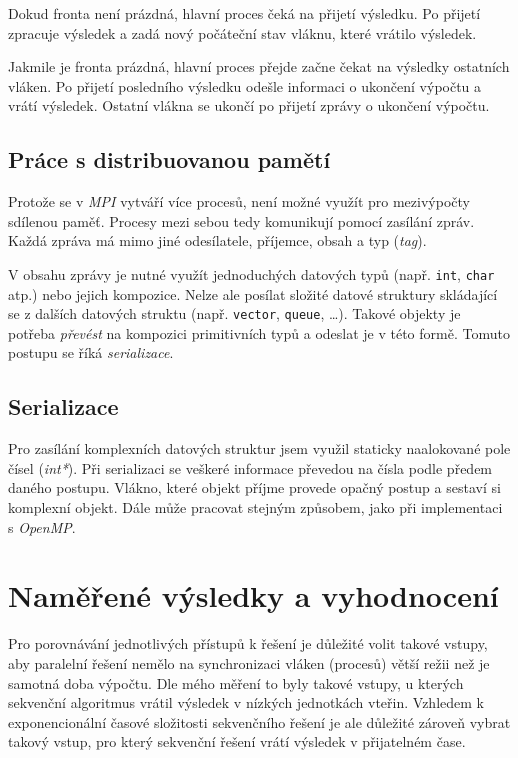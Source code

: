 \documentclass[czech]{article}
\begin{document}
Dokud fronta není prázdná, hlavní proces čeká na přijetí výsledku.
Po přijetí zpracuje výsledek a zadá nový počáteční stav vláknu, které vrátilo výsledek.

Jakmile je fronta prázdná, hlavní proces přejde začne čekat na výsledky ostatních vláken.
Po přijetí posledního výsledku odešle informaci o ukončení výpočtu a vrátí výsledek.
Ostatní vlákna se ukončí po přijetí zprávy o ukončení výpočtu.

\subsection{Práce s distribuovanou pamětí}

Protože se v \textit{MPI} vytváří více procesů, není možné využít pro mezivýpočty sdílenou paměť.
Procesy mezi sebou tedy komunikují pomocí zasílání zpráv.
Každá zpráva má mimo jiné odesílatele, příjemce, obsah a typ (\textit{tag}).

V obsahu zprávy je nutné využít jednoduchých datových typů (např. \texttt{int}, \texttt{char} atp.) nebo jejich kompozice.
Nelze ale posílat složité datové struktury skládající se z dalších datových struktu (např. \texttt{vector}, \texttt{queue}, \dots).
Takové objekty je potřeba \textit{převést} na kompozici primitivních typů a odeslat je v této formě.
Tomuto postupu se říká \textit{serializace}.

\subsection{Serializace}

Pro zasílání komplexních datových struktur jsem využil staticky naalokované pole čísel (\textit{int*}).
Při serializaci se veškeré informace převedou na čísla podle předem daného postupu.
Vlákno, které objekt příjme provede opačný postup a sestaví si komplexní objekt.
Dále může pracovat stejným způsobem, jako při implementaci s \textit{OpenMP}.

\section{Naměřené výsledky a vyhodnocení}

Pro porovnávání jednotlivých přístupů k řešení je důležité volit takové vstupy, aby paralelní řešení nemělo na synchronizaci vláken (procesů) větší režii než je samotná doba výpočtu.
Dle mého měření to byly takové vstupy, u kterých sekvenční algoritmus vrátil výsledek v nízkých jednotkách vteřin.
Vzhledem k exponencionální časové složitosti sekvenčního řešení je ale důležité zároveň vybrat takový vstup, pro který sekvenční řešení vrátí výsledek v přijatelném čase.
\end{document}
